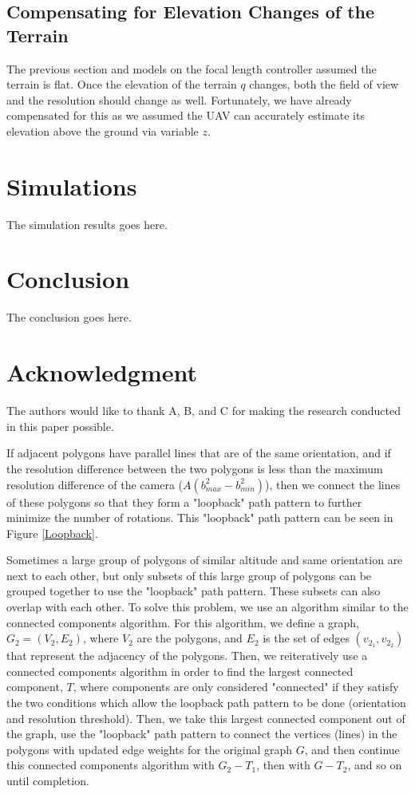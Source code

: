 \documentclass[conference]{IEEEtran}
\theoremstyle{plain}%
\begin{document}
\subsection{Compensating for Elevation Changes of the Terrain}
The previous section and models on the focal length controller assumed the terrain is flat. Once the elevation of the terrain $q$ changes, both the field of view and the resolution should change as well. Fortunately, we have already compensated for this as we assumed the UAV can accurately estimate its elevation above the ground via variable $z$.

\section{Simulations}
The simulation results goes here.

\section{Conclusion}
The conclusion goes here.

\section*{Acknowledgment}
The authors would like to thank A, B, and C for making the research conducted in this paper possible.


If adjacent polygons have parallel lines that are of the same orientation, and if the resolution difference between the two polygons is less than the maximum resolution difference of the camera ($A(b_{max}^2 - b_{min}^2)$), then we connect the lines of these polygons so that they form a "loopback" path pattern to further minimize the number of rotations. This "loopback" path pattern can be seen in Figure \ref{Loopback}.

Sometimes a large group of polygons of similar altitude and same orientation are next to each other, but only subsets of this large group of polygons can be grouped together to use the "loopback" path pattern. These subsets can also overlap with each other. To solve this problem, we use an algorithm similar to the connected components algorithm. For this algorithm, we define a graph, $G_2=(V_2,E_2)$, where $V_2$ are the polygons, and $E_2$ is the set of edges $(v_{2_1},v_{2_2})$ that represent the adjacency of the polygons. Then, we reiteratively use a connected components algorithm in order to find the largest connected component, $T$, where components are only considered "connected" if they satisfy the two conditions which allow the loopback path pattern to be done (orientation and resolution threshold). Then, we take this largest connected component out of the graph, use the "loopback" path pattern to connect the vertices (lines) in the polygons with updated edge weights for the original graph $G$, and then continue this connected components algorithm with $G_2-T_1$, then with $G-T_2$, and so on until completion.
\end{document}
